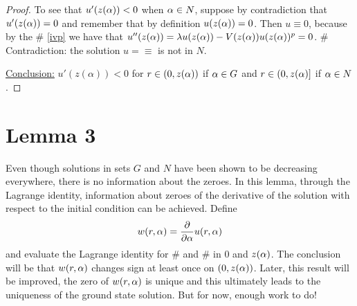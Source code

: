 \begin{proof}
To see that $u'(z(\alpha))<0$ when $\alpha\in N$, suppose by contradiction that $u'(z(\alpha))=0$ and remember that by definition $u(z(\alpha))=0$. Then $u\equiv0$, because by the \# \cref{ivp} we have that $u''(z(\alpha))=\lambda u(z(\alpha))-V(z(\alpha))u(z(\alpha))^p=0$. \# Contradiction: the solution $u=\equiv$ is not in $N$.

\underline{Conclusion:} $u'(z(\alpha))<0$ for $r\in(0,z(\alpha))$ if $\alpha\in G$ and $r\in(0,z(\alpha)]$ if $\alpha\in N$.
\end{proof}



\section{Lemma 3}
Even though solutions in sets $G$ and $N$ have been shown to be decreasing everywhere, there is no information about the zeroes. In this lemma, through the Lagrange identity, information about zeroes of the derivative of the solution with respect to the initial condition can be achieved. Define $$w(r,\alpha) = \frac{\partial}{\partial\alpha} u(r,\alpha)$$ and evaluate the Lagrange identity for \# and \# in $0$ and $z(\alpha)$. The conclusion will be that $w(r,\alpha)$ changes sign at least once on $(0,z(\alpha))$. Later, this result will be improved, the zero of $w(r,\alpha)$ is unique and this ultimately leads to the uniqueness of the ground state solution. But for now, enough work to do!

